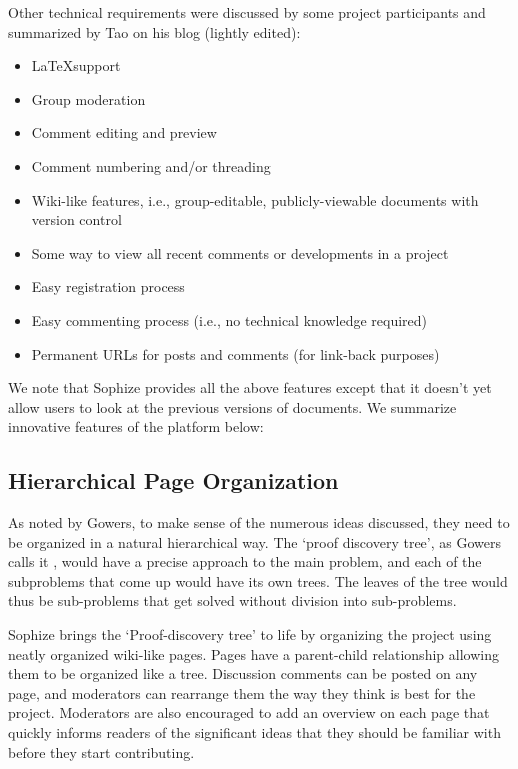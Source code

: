 \documentclass[a4paper]{article}
\begin{document}
Other technical requirements were discussed by some project participants and summarized by Tao on his blog\cite{whats_new_2009} (lightly edited):

\begin{itemize}

  \item \LaTeX\space support

  \item Group moderation

  \item Comment editing and preview

  \item Comment numbering and/or threading

  \item Wiki-like features, i.e., group-editable, publicly-viewable documents with version control

  \item Some way to view all recent comments or developments in a project

  \item Easy registration process

  \item Easy commenting process (i.e., no technical knowledge required)

  \item Permanent URLs for posts and comments (for link-back purposes)

\end{itemize}


We note that Sophize provides all the above features except that it doesn't yet allow users to look at the previous versions of documents. We summarize innovative features of the platform below:

\subsection{Hierarchical Page Organization}

As noted by Gowers, to make sense of the numerous ideas discussed, they need to be organized in a natural hierarchical way. The `proof discovery tree', as Gowers calls it \cite{gowers_weblog_2009}, would have a precise approach to the main problem, and each of the subproblems that come up would have its own trees. The leaves of the tree would thus be sub-problems that get solved without division into sub-problems.

Sophize brings the `Proof-discovery tree' to life by organizing the project using neatly organized wiki-like pages. Pages have a parent-child relationship allowing them to be organized like a tree. Discussion comments can be posted on any page, and moderators can rearrange them the way they think is best for the project. Moderators are also encouraged to add an overview on each page that quickly informs readers of the significant ideas that they should be familiar with before they start contributing.
\end{document}
